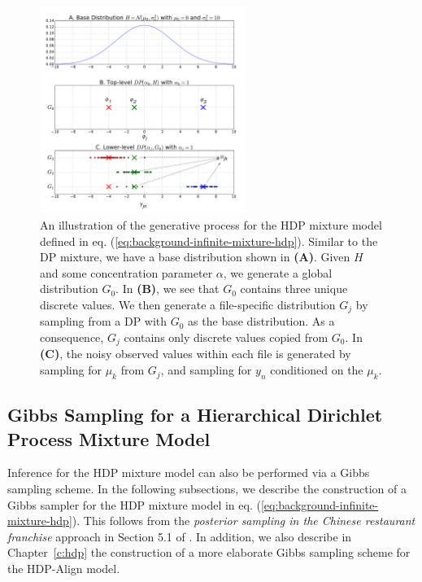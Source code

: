 \begin{figure}
\noindent \begin{centering}
\includegraphics[width=0.6\textwidth]{03-machine-learning/figures/hdp_samples.pdf}
\par\end{centering}
\caption[An illustration of the generative process for the HDP mixture model defined in eq. (\ref{eq:background-infinite-mixture-hdp}).]{\label{fig:g-from-hdp}An illustration of the generative process for the HDP mixture model defined in eq. (\ref{eq:background-infinite-mixture-hdp}). Similar to the DP mixture, we have a base distribution shown in \textbf{(A)}. Given $H$ and some concentration parameter $\alpha$, we generate a global distribution $G_0$. In \textbf{(B)}, we see that $G_0$ contains three unique discrete values. We then generate a file-specific distribution $G_j$ by sampling from a DP with $G_0$ as the base distribution. As a consequence, $G_j$ contains only discrete values copied from $G_0$. In \textbf{(C)}, the noisy observed values within each file is generated by sampling for $\mu_k$ from $G_j$, and sampling for $y_n$ conditioned on the $\mu_k$.}
\end{figure}

\subsection{Gibbs Sampling for a Hierarchical Dirichlet Process Mixture Model}

Inference for the HDP mixture model can also be performed via a Gibbs sampling scheme. In the following subsections, we describe the construction of a Gibbs sampler for the HDP mixture model in eq. (\ref{eq:background-infinite-mixture-hdp}). This follows from the \emph{posterior sampling in the Chinese restaurant franchise} approach in Section 5.1 of \cite{teh2005hierarchical}. In addition, we also describe in Chapter~\ref{c:hdp} the construction of a more elaborate Gibbs sampling scheme for the HDP-Align model.

